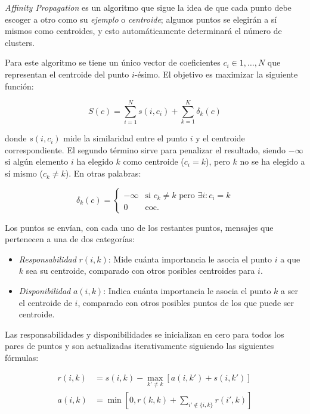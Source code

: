 \textit{Affinity Propagation} es un algoritmo que sigue la idea de que cada punto debe escoger a otro como su \textit{ejemplo} o \textit{centroide};
algunos puntos se elegirán a sí mismos como centroides, y esto automáticamente determinará el número de clusters.

Para este algoritmo se tiene un único vector de coeficientes $c_i \in {1,\dots,N}$ que representan el centroide del punto $i$-ésimo.
El objetivo es maximizar la siguiente función:

\begin{equation}
    \label{eq:affinity-propagation}
    S(c) = \sum_{i=1}^{N}s(i,c_i) + \sum_{k=1}^{K}{\delta_k(c)}
\end{equation}

\noindent
donde $s(i, c_i)$ mide la similaridad entre el punto $i$ y el centroide correspondiente.
El segundo término sirve para penalizar el resultado, siendo $-\infty$ si algún elemento $i$ ha elegido $k$ como centroide ($c_i = k$), pero $k$ no se ha elegido a sí mismo ($c_k \neq k$).
En otras palabras:

\begin{equation}
    \label{affinity-propagation-penalty}
    \delta_k(c) = \begin{cases}
                      -\infty & \text{si $c_k \neq k$ pero $\exists i: c_i = k$} \\
                      0 & \text{eoc.}
    \end{cases}
\end{equation}

Los puntos se envían, con cada uno de los restantes puntos, mensajes que pertenecen a una de dos categorías:
\begin{itemize}
    \item \textit{Responsabilidad} $r(i, k)$: Mide cuánta importancia le asocia el punto $i$ a que $k$ sea su centroide, comparado con otros posibles centroides para $i$.
    \item \textit{Disponibilidad} $a(i, k)$: Indica cuánta importancia le asocia el punto $k$ a ser el centroide de $i$, comparado con otros posibles puntos de los que puede ser centroide.
\end{itemize}

Las responsabilidades y disponibilidades se inicializan en cero para todos los pares de puntos y son actualizadas iterativamente siguiendo las siguientes fórmulas:

\begin{align}
    \label{eq:responsibility}
    r(i,k) &= s(i,k) - \max_{k' \neq k}\left[ a(i, k') + s(i,k') \right] \\
    \label{eq:availability}
    a(i, k) &= \min\left[ 0, r(k,k) + \sum_{i'\notin \{i, k\}}{r(i', k)} \right]
\end{align}

